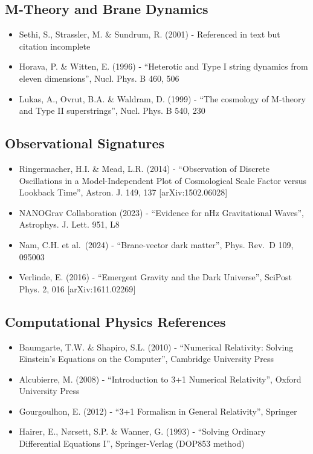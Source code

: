 \documentclass[
  11pt,
]{report}
\providecommand{\tightlist}{%
  \setlength{\itemsep}{0pt}\setlength{\parskip}{0pt}}
\begin{document}
\subsection{M-Theory and Brane
Dynamics}\label{m-theory-and-brane-dynamics}

\begin{itemize}
\tightlist
\item
  Sethi, S., Strassler, M. \& Sundrum, R. (2001) - Referenced in text
  but citation incomplete
\item
  Horava, P. \& Witten, E. (1996) - ``Heterotic and Type I string
  dynamics from eleven dimensions'', Nucl. Phys. B 460, 506
\item
  Lukas, A., Ovrut, B.A. \& Waldram, D. (1999) - ``The cosmology of
  M-theory and Type II superstrings'', Nucl. Phys. B 540, 230
\end{itemize}

\subsection{Observational Signatures}\label{observational-signatures}

\begin{itemize}
\tightlist
\item
  Ringermacher, H.I. \& Mead, L.R. (2014) - ``Observation of Discrete
  Oscillations in a Model-Independent Plot of Cosmological Scale Factor
  versus Lookback Time'', Astron. J. 149, 137 {[}arXiv:1502.06028{]}
\item
  NANOGrav Collaboration (2023) - ``Evidence for nHz Gravitational
  Waves'', Astrophys. J. Lett. 951, L8
\item
  Nam, C.H. et al.~(2024) - ``Brane-vector dark matter'', Phys. Rev.~D
  109, 095003
\item
  Verlinde, E. (2016) - ``Emergent Gravity and the Dark Universe'',
  SciPost Phys. 2, 016 {[}arXiv:1611.02269{]}
\end{itemize}

\subsection{Computational Physics
References}\label{computational-physics-references}

\begin{itemize}
\tightlist
\item
  Baumgarte, T.W. \& Shapiro, S.L. (2010) - ``Numerical Relativity:
  Solving Einstein's Equations on the Computer'', Cambridge University
  Press
\item
  Alcubierre, M. (2008) - ``Introduction to 3+1 Numerical Relativity'',
  Oxford University Press
\item
  Gourgoulhon, E. (2012) - ``3+1 Formalism in General Relativity'',
  Springer
\item
  Hairer, E., Nørsett, S.P. \& Wanner, G. (1993) - ``Solving Ordinary
  Differential Equations I'', Springer-Verlag (DOP853 method)
\end{itemize}
\end{document}

